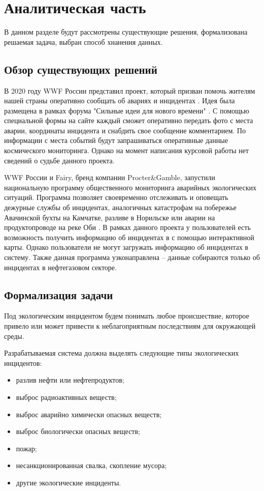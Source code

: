 \chapter{Аналитическая часть}
В данном разделе будут рассмотрены существующие решения, формализована решаемая задача, выбран способ хнанения данных. 

\section{Обзор существующих решений}
В 2020 году WWF России представил проект, который призван помочь жителям нашей страны оперативно сообщать об авариях и инцидентах \cite{wwf1}. Идея была размещена в рамках форума "Сильные идеи для нового времени" \cite{forum}. С помощью специальной формы на сайте каждый сможет оперативно передать фото с места аварии, координаты инцидента и снабдить свое сообщение комментарием. По информации с места событий будут запрашиваться оперативные данные космического мониторинга. Однако на момент написания курсовой работы нет сведений о судьбе данного проекта.

WWF России и Fairy, бренд компании Procter\&Gamble, запустили национальную программу общественного мониторинга аварийных экологических ситуаций. Программа позволяет своевременно отслеживать и оповещать дежурные службы об инцидентах, аналогичных катастрофам на побережье Авачинской бухты на Камчатке, разливе в Норильске или аварии на продуктопроводе на реке Оби \cite{wwf2}. В рамках данного проекта у пользователей есть возможность получить информацию об инцидентах в с помощью интерактивной карты. Однако пользователи не могут загружать информацию об инцидентах в систему. Также данная программа узконаправлена -- данные собираются только об инцидентах в нефтегазовом секторе. 

\section{Формализация задачи}
Под экологическим инцидентом будем понимать любое происшествие, которое привело или может привести к неблагоприятным последствиям для окружающей среды. 

Разрабатываемая система должна выделять следующие типы экологических инцидентов: 
\begin{itemize}
	\item разлив нефти или нефтепродуктов;
	\item выброс радиоактивных веществ;
	\item выброс аварийно химически опасных веществ;
	\item выброс биологически опасных веществ;
	\item пожар;
	\item несанкционированная свалка, скопление мусора;
	\item другие экологические инциденты.
\end{itemize}

